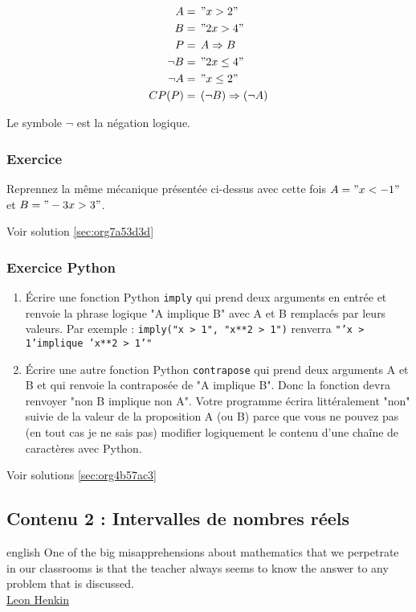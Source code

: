 \documentclass[a4paper, 11pt, twoside]{article}
\begin{document}
\begin{align*}
A &=\,"x > 2"\\
B &=\,"2x > 4"\\
P &=\,A\Rightarrow B\\
\neg B &=\, "2x \leq 4"\\
\neg A &=\, "x \leq 2"\\
CP(P) &=\,(\neg B)\Rightarrow(\neg A)
\end{align*}

Le symbole \(\neg\) est la négation logique.

\subsubsection{Exercice}
\label{sec:org09bf59f}
Reprennez la même mécanique présentée ci-dessus avec cette fois \(A
    = "x < -1"\) et \(B = "-3x > 3"\).

Voir solution \ref{sec:org7a53d3d}

\subsubsection{Exercice Python}
\label{sec:org1d3ea27}
\begin{enumerate}
\item Écrire une fonction Python \texttt{imply} qui prend deux arguments en
entrée et renvoie la phrase logique "A implique B" avec A et B
remplacés par leurs valeurs.
Par exemple : \texttt{imply("x > 1", "x**2 > 1")}
renverra \texttt{"'x > 1'implique 'x**2 > 1'"}
\item Écrire une autre fonction Python \texttt{contrapose} qui prend deux
arguments A et B et qui renvoie la contraposée de "A implique
B". Donc la fonction devra renvoyer "non B implique non
A". Votre programme écrira littéralement "non" suivie de la
valeur de la proposition A (ou B) parce que vous ne pouvez pas
(en tout cas je ne sais pas) modifier logiquement le contenu
d'une chaîne de caractères avec Python.
\end{enumerate}

Voir solutions \ref{sec:org4b57ac3}
\stopcontents[level-2]

\subsection{Contenu 2 : Intervalles de nombres réels}
\label{sec:org74265cf}

\begin{foreigndisplayquote}{english}
One of the big misapprehensions about mathematics that we
perpetrate in our classrooms is that the teacher always seems to
know the answer to any problem that is discussed.\\
\href{https://en.wikipedia.org/wiki/Leon\_Henkin}{Leon Henkin}
\end{foreigndisplayquote}
\end{document}
